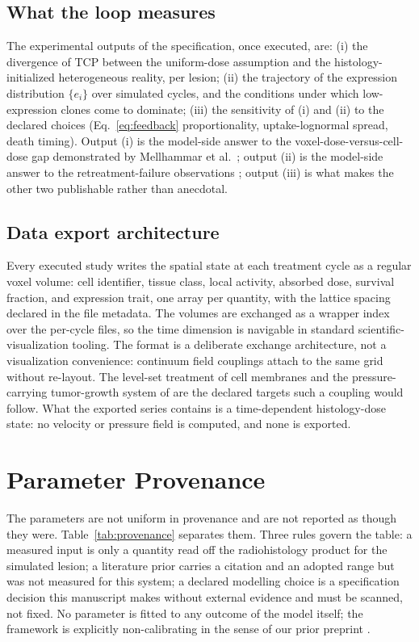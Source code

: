 \documentclass[11pt]{article}
\begin{document}
\subsection{What the loop measures}

The experimental outputs of the specification, once executed, are: (i) the
divergence of TCP between the uniform-dose assumption and the histology-initialized
heterogeneous reality, per lesion; (ii) the trajectory of the expression distribution
$\{e_i\}$ over simulated cycles, and the conditions under which low-expression clones
come to dominate; (iii) the sensitivity of (i) and (ii) to the declared choices
(Eq.~\ref{eq:feedback} proportionality, uptake-lognormal spread, death timing). Output
(i) is the model-side answer to the voxel-dose-versus-cell-dose gap demonstrated by
Mellhammar et al.\ \cite{mellhammar2023}; output (ii) is the model-side answer to the
retreatment-failure observations \cite{feijtel2021,fransson2024}; output (iii) is what
makes the other two publishable rather than anecdotal.

\subsection{Data export architecture}

Every executed study writes the spatial state at each treatment cycle as a
regular voxel volume: cell identifier, tissue class, local activity,
absorbed dose, survival fraction, and expression trait, one array per
quantity, with the lattice spacing declared in the file metadata. The
volumes are exchanged as a wrapper index over the per-cycle files, so the
time dimension is navigable in standard scientific-visualization tooling.
The format is a deliberate exchange architecture, not a visualization
convenience: continuum field couplings attach to the same grid without
re-layout. The level-set treatment of cell membranes
\cite{shen2022diffuse} and the pressure-carrying tumor-growth system of
\cite{li2026chns} are the declared targets such a coupling would follow.
What the exported series contains is a time-dependent histology-dose state:
no velocity or pressure field is computed, and none is exported.

\section{Parameter Provenance}\label{sec:params}

The parameters are not uniform in provenance and are not reported as though they were.
Table~\ref{tab:provenance} separates them. Three rules govern the table: a measured
input is only a quantity read off the radiohistology product for the simulated lesion; a
literature prior carries a citation and an adopted range but was not measured for this
system; a declared modelling choice is a specification decision this manuscript makes
without external evidence and must be scanned, not fixed. No parameter is fitted to any
outcome of the model itself; the framework is explicitly non-calibrating in the sense of
our prior preprint \cite{kinder2026biofilm}.
\end{document}
